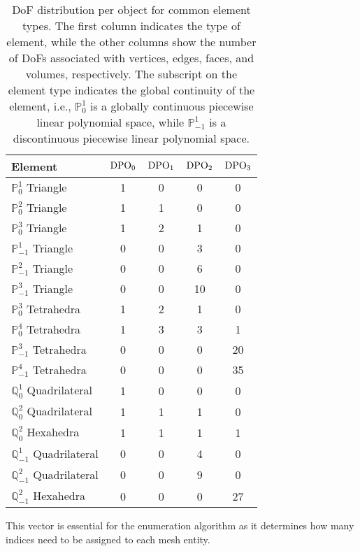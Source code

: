 \begin{table}[!h]
\centering
\begin{tabular}{|l|c|c|c|c|}
\hline
\textbf{Element} & $\mathrm{DPO}_0$ & $\mathrm{DPO}_1$ & $\mathrm{DPO}_2$ & $\mathrm{DPO}_3$ \\
\hline
$\mathbb{P}^1_0$ Triangle & 1 & 0 & 0 & 0 \\
$\mathbb{P}^2_0$ Triangle & 1 & 1 & 0 & 0 \\
$\mathbb{P}^3_0$ Triangle & 1 & 2 & 1 & 0 \\
$\mathbb{P}^1_{-1}$ Triangle & 0 & 0 & 3 & 0 \\
$\mathbb{P}^2_{-1}$ Triangle & 0 & 0 & 6 & 0 \\
$\mathbb{P}^3_{-1}$ Triangle & 0 & 0 & 10 & 0 \\
$\mathbb{P}^3_0$ Tetrahedra & 1 & 2 & 1 & 0 \\
$\mathbb{P}^4_0$ Tetrahedra & 1 & 3 & 3 & 1 \\
$\mathbb{P}^3_{-1}$ Tetrahedra & 0 & 0 & 0 & 20 \\
$\mathbb{P}^4_{-1}$ Tetrahedra & 0 & 0 & 0 & 35 \\
\hline
$\mathbb{Q}^1_0$ Quadrilateral & 1 & 0 & 0 & 0 \\
$\mathbb{Q}^2_0$ Quadrilateral & 1 & 1 & 1 & 0 \\
$\mathbb{Q}^2_0$ Hexahedra & 1 & 1 & 1 & 1 \\
$\mathbb{Q}^1_{-1}$ Quadrilateral & 0 & 0 & 4 & 0 \\
$\mathbb{Q}^2_{-1}$ Quadrilateral & 0 & 0 & 9 & 0 \\
$\mathbb{Q}^2_{-1}$ Hexahedra & 0 & 0 & 0 & 27 \\
\hline
\end{tabular}
\caption{DoF distribution per object for common element types. The first column indicates the type of element, while the other columns show the number of DoFs associated with vertices, edges, faces, and volumes, respectively. The subscript on the element type indicates the global continuity of the element, i.e., $\mathbb{P}^1_0$ is a globally continuous piecewise linear polynomial space, while $\mathbb{P}^1_{-1}$ is a discontinuous piecewise linear polynomial space.}
\label{tab:dof_distribution}
\end{table}

This vector is essential for the enumeration algorithm as it determines how many indices need to be assigned to each mesh entity.

